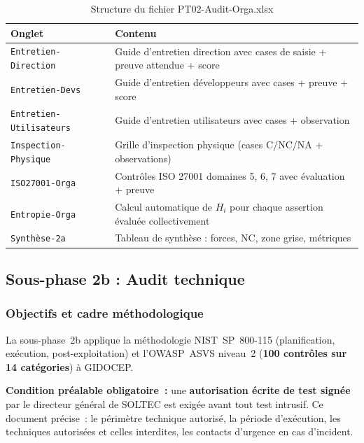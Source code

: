 \documentclass[12pt,a4paper,oneside]{report}
\begin{document}
\begin{table}[H]
\centering\small
\caption{Structure du fichier PT02-Audit-Orga.xlsx}
\label{tab:pt02}
\begin{tabularx}{\textwidth}{p{4cm}X}
\toprule
\rowcolor{theadcolor}
\color{white}\textbf{Onglet} &
\color{white}\textbf{Contenu} \\
\midrule
\texttt{Entretien-Direction} & Guide d'entretien direction avec cases de saisie + preuve attendue + score \\
\texttt{Entretien-Devs} & Guide d'entretien développeurs avec cases + preuve + score \\
\texttt{Entretien-Utilisateurs} & Guide d'entretien utilisateurs avec cases + observation \\
\texttt{Inspection-Physique} & Grille d'inspection physique (cases C/NC/NA + observations) \\
\texttt{ISO27001-Orga} & Contrôles ISO 27001 domaines 5, 6, 7 avec évaluation + preuve \\
\texttt{Entropie-Orga} & Calcul automatique de $H_i$ pour chaque assertion évaluée collectivement \\
\texttt{Synthèse-2a} & Tableau de synthèse : forces, NC, zone grise, métriques \\
\bottomrule
\end{tabularx}
\end{table}

\subsection{Sous-phase 2b : Audit technique}

\subsubsection{Objectifs et cadre m\'ethodologique}

La sous-phase~2b applique la m\'ethodologie NIST~SP~800-115 (planification,
ex\'ecution, post-exploitation) et l'OWASP~ASVS niveau~2 (\textbf{100 contr\^oles
sur 14 cat\'egories}) \`a GIDOCEP.

\textbf{Condition pr\'ealable obligatoire~:} une \textbf{autorisation \'ecrite
de test sign\'ee} par le directeur g\'en\'eral de SOLTEC est exig\'ee avant tout
test intrusif. Ce document pr\'ecise~: le p\'erim\`etre technique autoris\'e,
la p\'eriode d'ex\'ecution, les techniques autoris\'ees et celles interdites,
les contacts d'urgence en cas d'incident.
\end{document}

